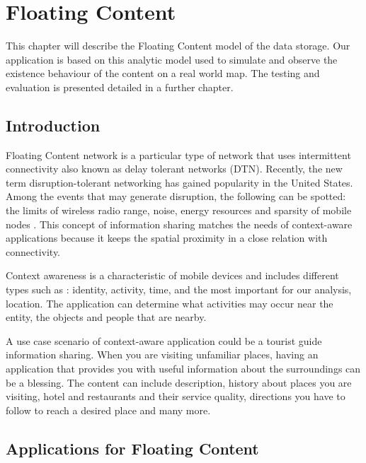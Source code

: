 
\chapter{Floating Content} \label{chap2}


This chapter will describe the Floating Content model of the data storage.
Our application is based on this analytic model used to simulate and observe the
existence behaviour of the content on a real world map. The testing and
evaluation is presented detailed in a further chapter.

\section{Introduction}
Floating Content network is a particular type of network that uses intermittent
connectivity also known as delay tolerant networks (DTN). Recently, the new term
disruption-tolerant networking has gained popularity in the United States.
Among the events that may generate disruption, the following can be spotted: the
limits of wireless radio range, noise, energy resources and sparsity of mobile
nodes \cite{wikipedia_dtn}. This concept of information sharing matches the
needs of context-aware applications because it keeps the spatial proximity in a
close relation with connectivity.

Context awareness is a characteristic of mobile devices and includes different
types such as : identity, activity, time, and the most important for our
analysis, location. The application can determine what activities may occur near
the entity, the objects and people that are nearby.

A use case scenario of context-aware application could be a tourist guide
information sharing. When you are visiting unfamiliar places, having an
application that provides you with useful information about the surroundings can
be a blessing. The content can include description, history about places you are
visiting, hotel and restaurants and their service quality, directions you have
to follow to reach a desired place and many more.

\section{Applications for Floating Content}

